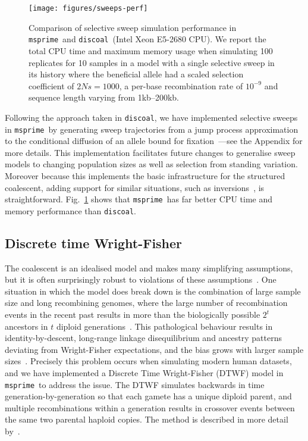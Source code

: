 \documentclass{article}
\newcommand{\msprime}[0]{\texttt{msprime}}
\newcommand{\discoal}[0]{\texttt{discoal}}
\begin{document}
\begin{figure}
\begin{center}
\texttt{[image: figures/sweeps-perf]}
\end{center}
\caption{\label{fig-selection-perf}Comparison of selective sweep simulation
performance in \msprime\ and \discoal\ (Intel Xeon E5-2680 CPU).
We report the total CPU time and maximum memory usage when simulating 100
replicates for 10 samples in a model
with a single selective sweep in its history where the beneficial
allele had a scaled selection coefficient of $2Ns=1000$,
a per-base recombination rate of $10^{-9}$ and sequence
length varying from 1kb--200kb.}
\end{figure}

Following the approach taken in \discoal, we
have implemented selective sweeps in \msprime\ by generating
sweep trajectories from a jump process approximation to the conditional diffusion
of an allele bound for
fixation~\citep{coop2004ancestral}---see the Appendix for more details.
This implementation facilitates future changes to generalise sweep models to
changing population sizes as well as selection from standing variation.
Moreover because this implements the basic infrastructure for the structured
coalescent, adding support for similar situations,
such as inversions~\citep{peischl2013sequential}, is straightforward.
Fig.~\ref{fig-selection-perf} shows that \msprime\ has far better
CPU time and memory performance than \discoal.

\subsection*{Discrete time Wright-Fisher}
The coalescent is an idealised model and makes many simplifying assumptions,
but it is often surprisingly robust to violations of these
assumptions~\citep{wakeley2012gene}. One situation in which the
model does break down is the combination of large sample size
and long recombining genomes, where the large
number of recombination events in the recent past results in
more than the biologically possible $2^t$ ancestors in
$t$ diploid generations~\citep{nelson2020accounting}.
This pathological behaviour results in
identity-by-descent,
long-range linkage disequilibrium and ancestry patterns deviating from
Wright-Fisher expectations, and the bias grows with larger sample
sizes~\citep{wakeley2012gene,bhaskar2014distortion,nelson2020accounting}.
Precisely this problem occurs when simulating modern human datasets,
and we have implemented a Discrete Time Wright-Fisher (DTWF) model
in \msprime\ to address the issue. The DTWF simulates backwards in
time generation-by-generation so that each gamete has a unique
diploid parent, and multiple recombinations within a generation results in
crossover events between the same two parental haploid copies.
The method is described in more detail by~\cite{nelson2020accounting}.
\end{document}
